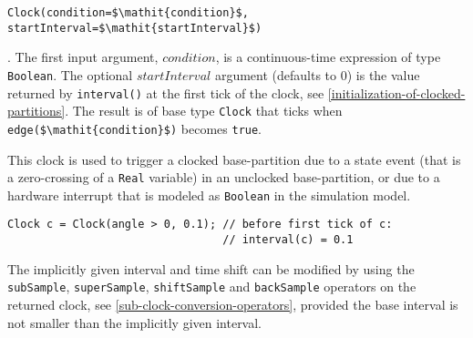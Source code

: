\begin{operatordefinition*}[Clock]\label{modelica:clock-event}
\begin{synopsis}\begin{lstlisting}
Clock(condition=$\mathit{condition}$, startInterval=$\mathit{startInterval}$)
\end{lstlisting}\end{synopsis}
\begin{semantics}
.
The first input argument, $\mathit{condition}$, is a continuous-time expression of type \lstinline!Boolean!.
The optional $\mathit{startInterval}$ argument (defaults to 0) is the value returned by \lstinline!interval()! at the first tick of the clock, see \cref{initialization-of-clocked-partitions}.
The result is of base type \lstinline!Clock! that ticks when \lstinline!edge($\mathit{condition}$)! becomes \lstinline!true!.
\begin{nonnormative}
This clock is used to trigger a clocked base-partition due to a state event (that is a zero-crossing of a \lstinline!Real! variable) in an unclocked base-partition, or due to a hardware interrupt that is modeled as \lstinline!Boolean! in the simulation model.
\end{nonnormative}

\begin{example}
\begin{lstlisting}[language=modelica]
Clock c = Clock(angle > 0, 0.1); // before first tick of c:
                                 // interval(c) = 0.1
\end{lstlisting}
\end{example}

\begin{nonnormative}
The implicitly given interval and time shift can be modified by using the \lstinline!subSample!, \lstinline!superSample!, \lstinline!shiftSample! and \lstinline!backSample! operators on the returned clock, see \cref{sub-clock-conversion-operators}, provided the base interval is not smaller than the implicitly given interval.
\end{nonnormative}
\end{semantics}
\end{operatordefinition*}

